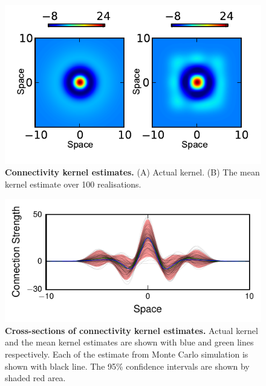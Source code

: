\documentclass[]{article}
\begin{document}
\begin{figure}[!ht]
\begin{center}
\includegraphics{./Figures/KernelEstimate.pdf}
\end{center}
\caption{{\bf Connectivity kernel estimates.} (A) Actual kernel. (B) The mean kernel estimate over 100 realisations.}
\label{fig:KernelEstimates}
\end{figure}
\begin{figure}[!ht]
\begin{center}
\includegraphics{./Figures/KernelEstimateCrossSection.pdf}
\end{center}
\caption{{\bf Cross-sections of connectivity kernel estimates.} Actual kernel and the mean kernel estimates are shown with blue and green lines respectively. Each of the estimate from Monte Carlo simulation is shown with black line. The 95\% confidence intervals are shown by shaded red area.}
\label{fig:KernelEstimateCrossSection}
\end{figure}
\end{document}
